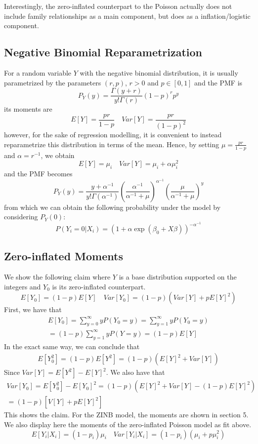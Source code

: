 \documentclass[12pt, titlepage]{article}
\begin{document}
	Interestingly, the zero-inflated counterpart to the Poisson actually does not include family relationships as a main component, but does as a inflation/logistic component.
	
	\subsection*{Negative Binomial Reparametrization}
	For a random variable $Y$ with the negative binomial distribution, it is usually parametrized by the parameters $(r,p)$, $r>0$ and $p\in[0,1]$ and the PMF is
	$$
	P_Y(y) = \frac{\Gamma(y+r)}{y!\Gamma(r)}(1-p)^{r}p^{y}
	$$
	its moments are
	$$
	E[Y] = \frac{pr}{1-p} \quad Var[Y] = \frac{pr}{(1-p)^2}
	$$
	however, for the sake of regression modelling, it is convenient to instead reparametrize this distribution in terms of the mean. Hence, by setting $\mu = \frac{pr}{1-p}$ and $\alpha = r^{-1}$, we obtain
	$$
	E[Y] = \mu_i \quad Var[Y] = \mu_i + \alpha\mu_i^2
	$$
	and the PMF becomes
	$$
	P_Y(y) = \frac{y + \alpha^{-1}}{y!\Gamma(\alpha^{-1})}\left(\frac{\alpha^{-1}}{\alpha^{-1} + \mu} \right)^{\alpha^{-1}}\left(\frac{\mu}{\alpha^{-1} + \mu} \right)^y
	$$
	from which we can obtain the following probability under the model by considering $P_Y(0)$:
	$$
	P(Y_i = 0 | X_i) = (1 + \alpha \exp(\beta_0 + X\beta))^{-\alpha^{-1}}
	$$
	\subsection*{Zero-inflated Moments}
	We show the following claim where $Y$ is a base distribution supported on the integers and $Y_0$ is its zero-inflated counterpart.
	$$
	E[Y_0] = (1-p)E[Y] \quad Var[Y_0] = (1-p)(Var[Y] + pE[Y]^2)
	$$
	First, we have that
	\begin{gather*}
		E[Y_0] = \sum_{y=0}^{\infty} yP(Y_0 = y) = \sum_{y=1}^{\infty} yP(Y_0 = y) \\
		= (1-p)\sum_{y=1}^{\infty}yP(Y=y) = (1-p)E[Y]
	\end{gather*}
	In the exact same way, we can conclude that
	\begin{gather*}
		E[Y_0^2] = (1-p)E[Y^2] = (1-p)(E[Y]^2 + Var[Y])
	\end{gather*}
	Since $Var[Y] = E[Y^2] - E[Y]^2$. We also have that
	\begin{gather*}
		Var[Y_0] = E[Y_0^2] - E[Y_0]^2 = (1-p)(E[Y]^2 + Var[Y] - (1-p)E[Y]^2) \\
		= (1-p)[V[Y] + pE[Y]^2]
	\end{gather*}
	This shows the claim. For the ZINB model, the moments are shown in section 5. We also display here the moments of the zero-inflated Poisson model as fit above. 
	$$
	E[Y_i|X_i] = (1-p_i)\mu_i \quad  Var[Y_i|X_i] = (1-p_i)(\mu_i + p\mu_i^2)
	$$
\end{document}
